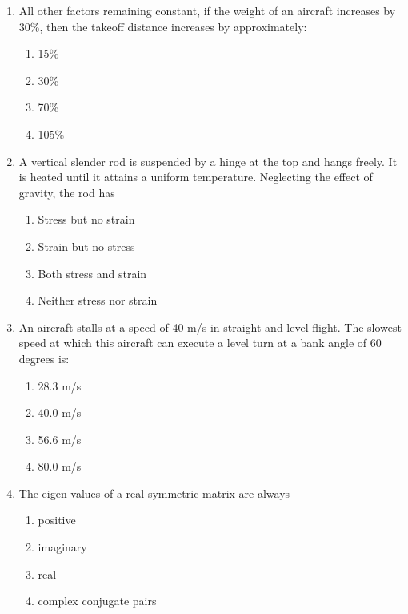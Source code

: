 \documentclass[journal]{IEEEtran}
\begin{document}
\begin{enumerate}[start=1]
\item All other factors remaining constant, if the weight of an aircraft increases by 30\%, then the takeoff distance increases by approximately:
\begin{multicols}{4}
\begin{enumerate}
    \item 15\%
    \item 30\%
    \item 70\% 
    \item 105\%
\end{enumerate}
\end{multicols}

\item A vertical slender rod is suspended by a hinge at the top and hangs freely. It is heated until it attains a uniform temperature. Neglecting the effect of gravity, the rod has
\begin{multicols}{2}
\begin{enumerate}
    \item Stress but no strain
    \item Strain but no stress
    \item Both stress and strain
    \item Neither stress nor strain
\end{enumerate}
\end{multicols}

 \item An aircraft stalls at a speed of 40 m/s in straight and level flight. The slowest speed at which this aircraft can execute a level turn at a bank angle of 60 degrees is:
    \begin{multicols}{4}
    \begin{enumerate}
    \item  28.3 m/s
    \item  40.0 m/s
    \item  56.6 m/s
    \item  80.0 m/s
\end{enumerate}
 \end{multicols}

\item The eigen-values of a real symmetric matrix are always
    \begin{multicols}{2}
        \begin{enumerate}
        \item positive
        \item imaginary
        \item real
        \item complex conjugate pairs
        \end{enumerate}
        \end{multicols}
        

\end{enumerate}
\end{document}
